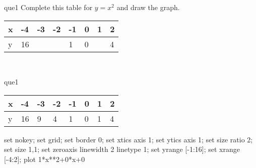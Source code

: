\documentclass[13.5pt, varwidth=true]{beamer}
\begin{document}
\begin{frame}[shrink=19,fragile]
	\begin{beamercolorbox}[rounded=true, left, shadow=true,wd=14.8cm]{que1}
		 Complete this table for $y = x^{2}$ and draw the graph. \\[0.3cm] \renewcommand{\arraystretch}{1.2}\begin{tabular}{|C|C|C|C|C|C|C|C|} \hline x & -4 & -3 & -2 & -1 & 0 & 1 & 2 \\ \hline y & 16 &  &  & 1 & 0 &  & 4\\ \hline \end{tabular}\\[0.3cm]
	\end{beamercolorbox}
\end{frame}
\begin{frame}[shrink=19,fragile]
	\begin{beamercolorbox}[rounded=true, left, shadow=true,wd=14.8cm]{que1}
		\renewcommand{\arraystretch}{1.2}\begin{tabular}{|C|C|C|C|C|C|C|C|} \hline x & -4 & -3 & -2 & -1 & 0 & 1 & 2 \\ \hline y & 16 & 9 & 4 & 1 & 0 & 1 & 4\\ \hline \end{tabular}\begin{gnuplot}[terminal=pdf] set nokey; set grid; set border 0; set xtics axis 1; set ytics axis 1; set size ratio 2; set size 1,1; set zeroaxis linewidth 2 linetype 1; set yrange [-1:16]; set xrange [-4:2]; plot 1*x**2+0*x+0 \end{gnuplot}
	\end{beamercolorbox}
\end{frame}
\end{document}
